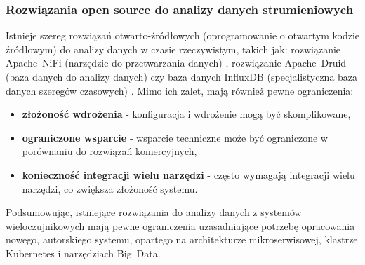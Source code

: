 \newpage

\subsubsection{Rozwiązania open source do analizy danych strumieniowych}
\label{subsubsec:open_source}

Istnieje szereg rozwiązań otwarto-źródłowych (oprogramowanie o otwartym kodzie źródłowym) do analizy danych w czasie rzeczywistym, takich jak: rozwiązanie \mbox{Apache NiFi} (narzędzie do przetwarzania danych) \cite{apache_nifi},
rozwiązanie \mbox{Apache Druid} (baza danych do analizy danych) \cite{apache_druid} czy baza danych \mbox{InfluxDB} (specjalistyczna baza danych szeregów czasowych) \cite{influxdb}. Mimo ich zalet, mają również pewne ograniczenia:

\begin{itemize}
    \item \textbf{złożoność wdrożenia} - konfiguracja i wdrożenie mogą być skomplikowane,
    \item \textbf{ograniczone wsparcie} - wsparcie techniczne może być ograniczone w porównaniu do rozwiązań komercyjnych,
    \item \textbf{konieczność integracji wielu narzędzi} - często wymagają integracji wielu narzędzi, co zwiększa złożoność systemu.
\end{itemize}

Podsumowując, istniejące rozwiązania do analizy danych z systemów wieloczujnikowych mają pewne ograniczenia uzasadniające potrzebę opracowania nowego, autorskiego systemu, opartego na architekturze mikroserwisowej, klastrze Kubernetes i narzędziach \mbox{Big Data}.